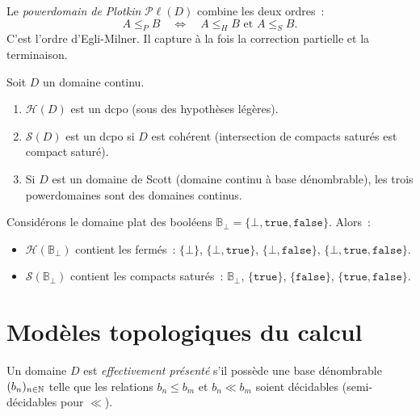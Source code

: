 \begin{definition}
Le \emph{powerdomain de Plotkin} $\mathcal{P}\ell(D)$ combine les deux ordres~:
\[
  A \leq_P B \quad \Longleftrightarrow \quad A \leq_H B \text{ et } A \leq_S B.
\]
C'est l'ordre d'Egli-Milner. Il capture \`a la fois la correction partielle et la
terminaison.
\end{definition}

\begin{theoreme}
Soit $D$ un domaine continu.
\begin{enumerate}
  \item $\mathcal{H}(D)$ est un dcpo (sous des hypoth\`eses l\'eg\`eres).
  \item $\mathcal{S}(D)$ est un dcpo si $D$ est coh\'erent (intersection de compacts
    satur\'es est compact satur\'e).
  \item Si $D$ est un domaine de Scott (domaine continu \`a base d\'enombrable), les trois
    powerdomaines sont des domaines continus.
\end{enumerate}
\end{theoreme}

\begin{exemple}
Consid\'erons le domaine plat des bool\'eens $\mathbb{B}_\bot = \{\bot, \mathtt{true},
\mathtt{false}\}$. Alors~:
\begin{itemize}
  \item $\mathcal{H}(\mathbb{B}_\bot)$ contient les ferm\'es~: $\{\bot\}$,
    $\{\bot, \mathtt{true}\}$, $\{\bot, \mathtt{false}\}$,
    $\{\bot, \mathtt{true}, \mathtt{false}\}$.
  \item $\mathcal{S}(\mathbb{B}_\bot)$ contient les compacts satur\'es~:
    $\mathbb{B}_\bot$, $\{\mathtt{true}\}$, $\{\mathtt{false}\}$,
    $\{\mathtt{true}, \mathtt{false}\}$.
\end{itemize}
\end{exemple}

\section{Mod\`eles topologiques du calcul}

\begin{definition}
Un domaine $D$ est \emph{effectivement pr\'esent\'e} s'il poss\`ede une base d\'enombrable
$(b_n)_{n \in \mathbb{N}}$ telle que les relations $b_n \leq b_m$ et $b_n \ll b_m$ soient
d\'ecidables (semi-d\'ecidables pour $\ll$).
\end{definition}

